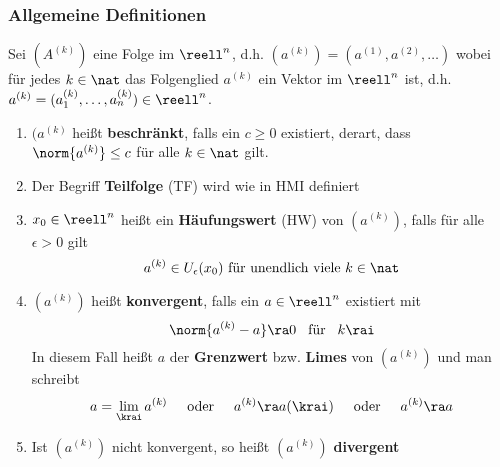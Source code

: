 \documentclass{kit}
\begin{document}
    \subsubsection{Allgemeine Definitionen}
      Sei $(A^{(k)})$ eine Folge im $\reell^n$, d.h. $(a^{(k)})=(a^{(1)},a^{(2)},\dots)$ wobei für jedes $k\in\nat$ das
      Folgenglied $a^{(k)}$ ein Vektor im $\reell^n$ ist, d.h. $a^{(k)}=(a_1^{(k)},\dots,a_n^{(k)})\in\reell^n$.
      \begin{enumerate}
        \item $(a^{(k)}$ heißt \textbf{beschränkt}, falls ein $c\ge0$ existiert, derart, dass $\norm{a^{(k)}}\le c$ für
          alle $k\in\nat$ gilt.
        \item Der Begriff \textbf{Teilfolge} (TF) wird wie in HMI definiert
        \item $x_0\in\reell^n$ heißt ein \textbf{Häufungswert} (HW) von $(a^{(k)})$, falls für alle $\epsilon>0$ gilt
          $$a^{(k)}\in U_\epsilon(x_0)\text{ für unendlich viele }k\in\nat$$
        \item $(a^{(k)})$ heißt \textbf{konvergent}, falls ein $a\in\reell^n$ existiert mit
          $$\norm{a^{(k)}-a}\ra0\hspace{0.3cm}\text{für}\hspace{0.3cm}k\rai$$
          In diesem Fall heißt $a$ der \textbf{Grenzwert} bzw. \textbf{Limes} von $(a^{(k)})$ und man schreibt
          $$a=\lim_\krai a^{(k)}\hspace{0.5cm}\text{oder}\hspace{0.5cm}a^{(k)}\ra a (\krai)\hspace{0.5cm}\text{oder}
          \hspace{0.5cm}a^{(k)}\ra a$$
        \item Ist $(a^{(k)})$ nicht konvergent, so heißt $(a^{(k)})$ \textbf{divergent}
      \end{enumerate}
\end{document}
